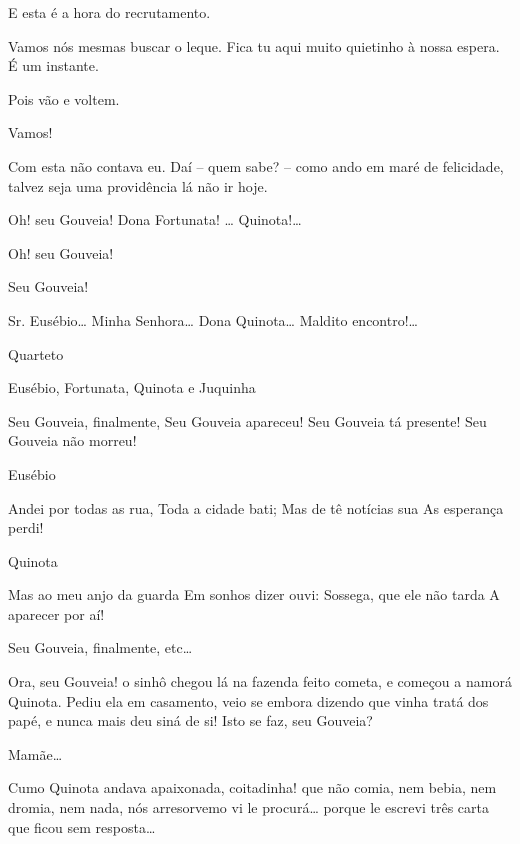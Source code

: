  E esta é a hora do recrutamento.

 Vamos nós mesmas buscar o leque. Fica tu aqui muito quietinho à
nossa espera. É um instante.

 Pois vão e voltem.

 Vamos! 


 Com esta não contava eu. Daí -- quem sabe? -- como ando em maré
de felicidade, talvez seja uma providência lá não ir hoje. 

 Oh! seu Gouveia!  Dona Fortunata! \ldots{} Quinota!\ldots{}

 Oh! seu Gouveia! 

 Seu Gouveia! 

  Sr. Eusébio\ldots{} Minha Senhora\ldots{} Dona Quinota\ldots{}  Maldito encontro!\ldots{}

 Quarteto

 Eusébio, Fortunata, Quinota e Juquinha

 Seu Gouveia, finalmente,
 Seu Gouveia apareceu!
 Seu Gouveia tá presente!
 Seu Gouveia não morreu!

 Eusébio

 Andei por todas as rua,
 Toda a cidade bati;
 Mas de tê notícias sua
 As esperança perdi!

 Quinota

 Mas ao meu anjo da guarda
 Em sonhos dizer ouvi:
 Sossega, que ele não tarda
 A aparecer por aí!

 Seu Gouveia, finalmente, etc\ldots{}

 Ora, seu Gouveia! o sinhô chegou lá na fazenda feito cometa, e
começou a namorá Quinota. Pediu ela em casamento, veio se embora dizendo
que vinha tratá dos papé, e nunca mais deu siná de si! Isto se faz, seu
Gouveia?

 Mamãe\ldots{}

 Cumo Quinota andava apaixonada, coitadinha! que não comia, nem
bebia, nem dromia, nem nada, nós arresorvemo vi le procurá\ldots{} porque le
escrevi três carta que ficou sem resposta\ldots{}

